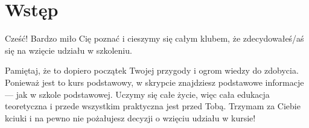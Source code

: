 \section{Wstęp}

Cześć! Bardzo miło Cię poznać i cieszymy się całym klubem, że zdecydowałeś/aś się na wzięcie udziału w szkoleniu.

Pamiętaj, że to dopiero początek Twojej przygody i ogrom wiedzy do zdobycia. Ponieważ jest to kurs podstawowy, w skrypcie znajdziesz podstawowe informacje — jak w szkole podstawowej. Uczymy się całe życie, więc cała edukacja teoretyczna i przede wszystkim praktyczna jest przed Tobą. Trzymam za Ciebie kciuki i na pewno nie pożałujesz decyzji o wzięciu udziału w kursie!